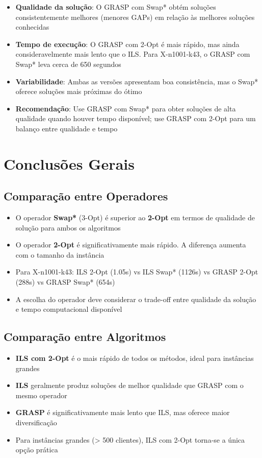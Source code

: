 \documentclass[12pt,a4paper]{article}
\begin{document}
\begin{itemize}
    \item \textbf{Qualidade da solução}: O GRASP com Swap* obtém soluções consistentemente melhores (menores GAPs) em relação às melhores soluções conhecidas
    \item \textbf{Tempo de execução}: O GRASP com 2-Opt é mais rápido, mas ainda consideravelmente mais lento que o ILS. Para X-n1001-k43, o GRASP com Swap* leva cerca de 650 segundos
    \item \textbf{Variabilidade}: Ambas as versões apresentam boa consistência, mas o Swap* oferece soluções mais próximas do ótimo
    \item \textbf{Recomendação}: Use GRASP com Swap* para obter soluções de alta qualidade quando houver tempo disponível; use GRASP com 2-Opt para um balanço entre qualidade e tempo
\end{itemize}

\clearpage

\section{Conclusões Gerais}

\subsection{Comparação entre Operadores}

\begin{itemize}
    \item O operador \textbf{Swap*} (3-Opt) é superior ao \textbf{2-Opt} em termos de qualidade de solução para ambos os algoritmos
    \item O operador \textbf{2-Opt} é significativamente mais rápido. A diferença aumenta com o tamanho da instância
    \item Para X-n1001-k43: ILS 2-Opt (1.05s) vs ILS Swap* (1126s) vs GRASP 2-Opt (288s) vs GRASP Swap* (654s)
    \item A escolha do operador deve considerar o trade-off entre qualidade da solução e tempo computacional disponível
\end{itemize}

\subsection{Comparação entre Algoritmos}

\begin{itemize}
    \item \textbf{ILS com 2-Opt} é o mais rápido de todos os métodos, ideal para instâncias grandes
    \item \textbf{ILS} geralmente produz soluções de melhor qualidade que GRASP com o mesmo operador
    \item \textbf{GRASP} é significativamente mais lento que ILS, mas oferece maior diversificação
    \item Para instâncias grandes (> 500 clientes), ILS com 2-Opt torna-se a única opção prática
\end{itemize}
\end{document}

